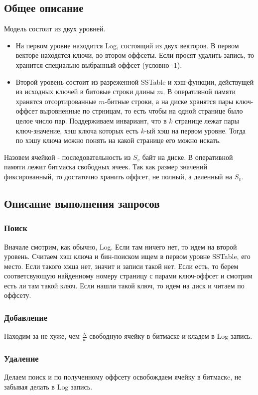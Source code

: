 \subsection*{Общее описание}
Модель состоит из двух уровней. 
\begin{itemize} 
\item 
  На первом уровне находится Log, состоящий из двух векторов. В первом векторе находятся ключи, во втором оффсеты. Если просят удалить запись, то хранится специально выбранный оффсет (условно -1).
\item
  Второй уровень состоит из разреженной SSTable и хэш-функции, действущей из исходных ключей в битовые строки длины $m$.
  В оперативной памяти хранятся отсортированные $m$-битные строки, а на диске хранятся пары ключ-оффсет выровненные по стрницам, 
  то есть чтобы на одной странице было целое число пар. Поддерживаем инвариант, что в $k$ странице лежат пары ключ-значение, хэш ключа которых есть $k$-ый хэш на первом уровне. 
  Тогда по хэшу ключа можно понять на какой странице его можно искать.
\end{itemize}

Назовем ячейкой - последовательность из $S_v$ байт на диске. В оперативной памяти лежит битмаска свободных ячеек. Так как размер значений фиксированный, то достаточно хранить оффсет, не полный, а деленный
на $S_v$.

\subsection*{Описание выполнения запросов}
\subsubsection*{Поиск}
Вначале смотрим, как обычно, Log. Если там ничего нет, то идем на второй уровень. Считаем хэш ключа и бин-поиском ищем в первом уровне SSTable, его место. Если такого хэша нет, значит и записи такой нет.
Если есть, то берем соответсвующую найденному номеру страницу с парами ключ-оффсет и смотрим есть ли там такой ключ. 
Если нашли такой ключ, то идем на диск и читаем по оффсету.

\subsubsection*{Добавление}
Находим за не хуже, чем $\frac{N}{w}$ свободную ячейку в битмаске и кладем в Log запись.

\subsubsection*{Удаление}
Делаем поиск и по полученному оффсету освобождаем ячейку в битмаскe, не забывая делать в Log запись.


